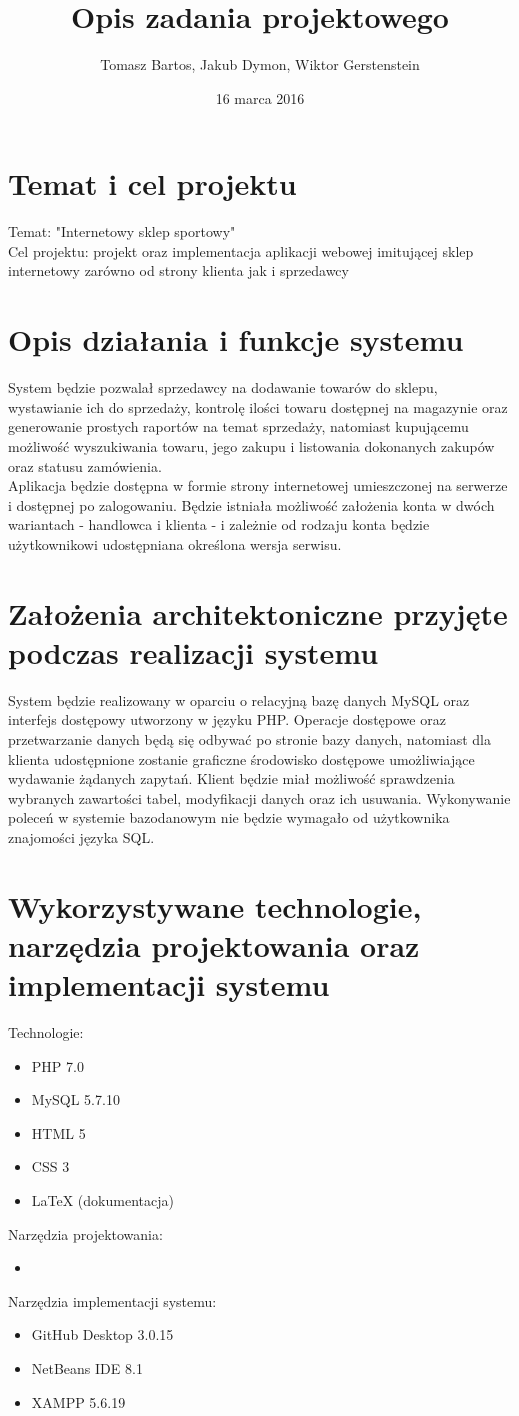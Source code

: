 \documentclass[a4paper, 11pt]{article}
\title{Opis zadania projektowego}
\author{Tomasz Bartos, Jakub Dymon, Wiktor Gerstenstein}
\date{16 marca 2016}
\begin{document}
\maketitle
\section{Temat i cel projektu}
Temat: "Internetowy sklep sportowy"\\
Cel projektu: projekt oraz implementacja aplikacji webowej imitującej sklep internetowy zarówno od strony klienta jak i sprzedawcy
\section{Opis działania i funkcje systemu}
System będzie pozwalał sprzedawcy na dodawanie towarów do sklepu, wystawianie ich do sprzedaży, kontrolę ilości towaru dostępnej na magazynie oraz generowanie prostych raportów na temat sprzedaży, natomiast kupującemu możliwość wyszukiwania towaru, jego zakupu i listowania dokonanych zakupów oraz statusu zamówienia.\\
Aplikacja będzie dostępna w formie strony internetowej umieszczonej na serwerze i dostępnej po zalogowaniu. Będzie istniała możliwość założenia konta w dwóch wariantach - handlowca i klienta - i zależnie od rodzaju konta będzie użytkownikowi udostępniana określona wersja serwisu.
\section{Założenia architektoniczne przyjęte podczas realizacji systemu}
System będzie realizowany w oparciu o relacyjną bazę danych MySQL oraz interfejs dostępowy utworzony w języku PHP. Operacje dostępowe oraz przetwarzanie danych będą się odbywać po stronie bazy danych, natomiast dla klienta udostępnione zostanie graficzne środowisko dostępowe umożliwiające wydawanie żądanych zapytań. Klient będzie miał możliwość sprawdzenia wybranych zawartości tabel, modyfikacji danych oraz ich usuwania. Wykonywanie poleceń w systemie bazodanowym nie będzie wymagało od użytkownika znajomości języka SQL.
\section{Wykorzystywane technologie, narzędzia projektowania oraz implementacji systemu}
Technologie:
\begin{itemize}
	\item PHP 7.0
	\item MySQL 5.7.10
	\item HTML 5
	\item CSS 3
	\item LaTeX (dokumentacja)
\end{itemize}
Narzędzia projektowania:
\begin{itemize}
	\item %
\end{itemize}
Narzędzia implementacji systemu:
\begin{itemize}
	\item GitHub Desktop 3.0.15
	\item NetBeans IDE 8.1
	\item XAMPP 5.6.19
\end{itemize}
\end{document}
